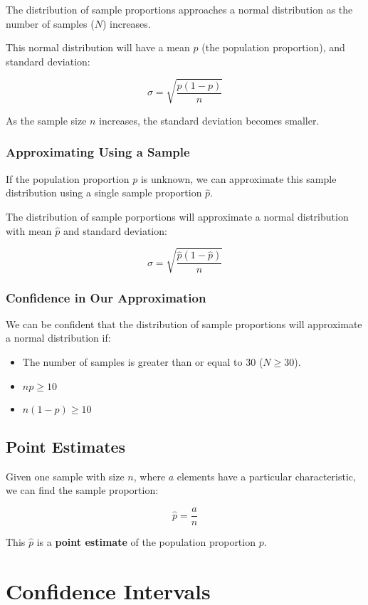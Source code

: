 \documentclass[a4paper,11pt]{article}
\begin{document}
The distribution of sample proportions approaches a normal distribution as the
number of samples ($N$) increases.

This normal distribution will have a mean $p$ (the population proportion), and
standard deviation:

$$
\sigma = \sqrt{\frac{p(1 - p)}{n}}
$$

As the sample size $n$ increases, the standard deviation becomes smaller.

\subsubsection{Approximating Using a Sample}

If the population proportion $p$ is unknown, we can approximate this sample
distribution using a single sample proportion $\hat{p}$.

The distribution of sample porportions will approximate a normal distribution
with mean $\hat{p}$ and standard deviation:

$$
\sigma = \sqrt{\frac{\hat{p}(1 - \hat{p})}{n}}
$$

\subsubsection{Confidence in Our Approximation}

We can be confident that the distribution of sample proportions will approximate
a normal distribution if:

\begin{itemize}
\item The number of samples is greater than or equal to 30 ($N \geq 30$).
\item $np \geq 10$
\item $n(1 - p) \geq 10$
\end{itemize}

\subsection{Point Estimates}

Given one sample with size $n$, where $a$ elements have a particular
characteristic, we can find the sample proportion:

$$
\hat{p} = \frac{a}{n}
$$

This $\hat{p}$ is a \textbf{point estimate} of the population proportion $p$.



\section{Confidence Intervals}
\end{document}
